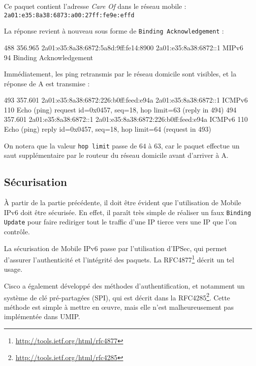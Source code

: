 Ce paquet contient l'adresse \emph{Care Of} dans le réseau mobile : \texttt{2a01:e35:8a38:6873:a00:27ff:fe9e:effd}

La réponse revient à nouveau sous forme de \texttt{Binding Acknowledgement} :

\begin{paquet}
488	356.965	2a01:e35:8a38:6872:5a8d:9ff:fe14:8900	2a01:e35:8a38:6872::1	MIPv6	94	Binding Acknowledgement
\end{paquet}

Immédiatement, les ping retransmis par le réseau domicile sont visibles, et la réponse de A est transmise :

\begin{paquet}
493	357.601	2a01:e35:8a38:6872:226:b0ff:feed:e94a	2a01:e35:8a38:6872::1	ICMPv6	110	Echo (ping) request id=0x0457, seq=18, hop limit=63 (reply in 494)
494	357.601	2a01:e35:8a38:6872::1	2a01:e35:8a38:6872:226:b0ff:feed:e94a	ICMPv6	110	Echo (ping) reply id=0x0457, seq=18, hop limit=64 (request in 493)
\end{paquet}

On notera que la valeur \texttt{hop limit} passe de $64$ à $63$, car le paquet effectue un saut supplémentaire par le routeur du réseau domicile avant d'arriver à A.

\subsection{Sécurisation}

À partir de la partie précédente, il doit être évident que l'utilisation de Mobile IPv6 doit être sécurisée.
En effet, il paraît très simple de réaliser un faux \texttt{Binding Update} pour faire rediriger tout le traffic d'une IP tierce vers une IP que l'on contrôle.

La sécurisation de Mobile IPv6 passe par l'utilisation d'IPSec, qui permet d'assurer l'authenticité et l'intégrité des paquets.
La RFC4877\footnote{\url{http://tools.ietf.org/html/rfc4877}} décrit un tel usage.

Cisco a également développé des méthodes d'authentification, et notamment un système de clé pré-partagées (SPI), qui est décrit dans la RFC4285\footnote{\url{http://tools.ietf.org/html/rfc4285}}.
Cette méthode est simple à mettre en œuvre, mais elle n'est malheureusement pas implémentée dans UMIP.

